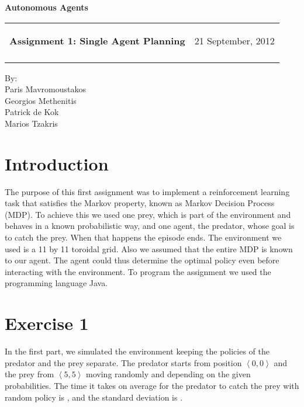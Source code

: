 \documentclass[a4paper,11pt]{article}
\makeatletter
\newcommand{\resheading}[1]{{\large \colorbox{mygrey}{\begin{minipage}{\textwidth}{\textbf{#1 \vphantom{p\^{E}}}}\end{minipage}}}}
\newcommand{\mywebheader}{
  \begin{tabular}{@{}p{5in}p{4in}}
  {\resheading{Assignment 1: Single Agent Planning}} & {\Large 21 September, 2012}\\\vspace{0.2cm}
  \end{tabular}}
\makeatother
\begin{document}
\begin{center}
{\LARGE \textbf{Autonomous Agents}}\\ [1em]
\end{center}
\mywebheader

\begin{center}
{\Large By:} \\ \vspace{0.1cm}
{\Large Paris Mavromoustakos} \\  \vspace{0.1cm}
{\Large Georgios Methenitis} \\ \vspace{0.1cm}
{\Large Patrick de Kok} \\ \vspace{0.1cm}
{\Large Marios Tzakris}
\end{center}


\section*{Introduction}
The purpose of this first assignment was to implement a reinforcement learning task that satisfies the Markov property, known as Markov Decision Process (MDP). To achieve this we used one prey, which is part of the environment and behaves in a known probabilistic way, and one agent, the predator, whose goal is to catch the prey. When that happens the episode ends. The environment we used is a 11 by 11 toroidal grid. Also we assumed that the entire MDP is known to our agent. The agent could thus determine the optimal policy even before interacting with the environment. To program the assignment we used the programming language Java.

\section*{Exercise 1}
In the first part, we simulated the environment keeping the policies of the predator and the prey separate. The predator starts from position $\left<0,0\right>$ and the prey from $\left<5,5\right>$ moving randomly and depending on the given probabilities. The time it takes on average for the predator to catch the prey with random policy is %
, and the standard deviation is %
.

\end{document}
